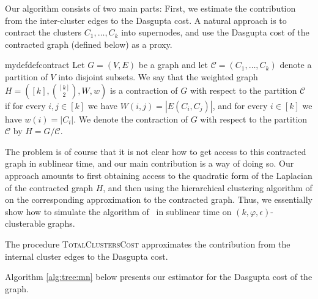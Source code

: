 \documentclass[letterpaper,11pt]{article}
\newcommand{\cC}{\mathcal{C}}
\theoremstyle{plain}
\theoremstyle{definition}
\theoremstyle{remark}
\newcommand{\e}{\epsilon}
\begin{document}
Our algorithm consists of two main parts: First, we estimate the contribution from the inter-cluster edges to the Dasgupta cost. A natural approach is to contract the clusters $C_1, \ldots, C_k$ into supernodes, and use the Dasgupta cost of the contracted graph (defined below) as a proxy.
\begin{restatable}{mydef}{defcontract}
\label{def:contracted}
\label{def:weighetdcontracted}
Let $G=(V,E)$ be a graph and let $\cC = (C_1, \ldots , C_k)$ denote a partition of $V$ into disjoint subsets.  We say that the weighted graph $H=\left([k], {[k] \choose 2}, W, w\right)$ is a contraction of $G$ with respect to the partition $\cC$ if for every $i,j\in [k]$ we have $W(i,j)=|E(C_i, C_j)|$, and for every $i\in[k]$ we have $w(i)=|C_i|$. 
We denote the contraction of $G$ with respect to the partition $\cC $ by  $H = G/\cC$.
\end{restatable}
The problem is of course that it is not clear how to get access to this contracted graph in sublinear time, and our main contribution is a way of doing so. 
Our approach  amounts to first obtaining access to the quadratic form of the Laplacian of the contracted graph $H$, and then using the hierarchical clustering algorithm of \cite{charikar2017approximate} 
on the corresponding approximation to the contracted graph. Thus, we essentially show how to simulate the algorithm of~\cite{charikar2017approximate} in sublinear time on $(k, \varphi, \e)$-clusterable graphs.

The procedure \textsc{TotalClustersCost} approximates the contribution from the internal cluster edges to the Dasgupta cost. 

Algorithm \ref{alg:tree:mn} below presents our estimator for the Dasgupta cost of the graph. 
\end{document}
